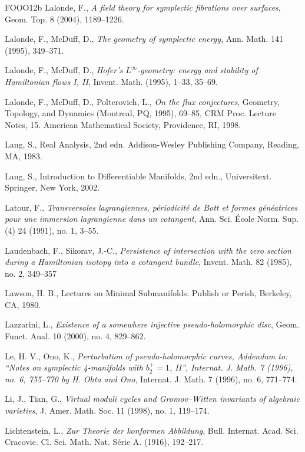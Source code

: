 \begin{thebibliography}{FOOO12b}
 Lalonde, F., \emph{A field theory for symplectic fibrations over surfaces}, Geom. Top.
  8 (2004), 1189–1226.

 Lalonde, F., McDuﬀ, D., \emph{The geometry of symplectic energy}, Ann. Math. 141
  (1995), 349–371.

 Lalonde, F., McDuff, D., \emph{Hofer’s $L^\infty$-geometry: energy and stability
  of Hamiltonian flows I, II}, Invent. Math. (1995), 1–33, 35–69.

 Lalonde, F., McDuﬀ, D., Polterovich, L., \emph{On the flux conjectures},
  Geom\-etry, Topology, and Dynamics (Montreal, PQ, 1995), 69–85, CRM Proc. Lecture Notes, 15. American
  Mathematical Society, Providence, RI, 1998.

 Lang, S., Real Analysis, 2nd edn. Addison-Wesley Publishing Company, Reading, MA,
  1983.

 Lang, S., Introduction to Diﬀerentiable Manifolds, 2nd edn., Universi\-text.
  Springer, New York, 2002.

 Latour, F., \emph{Transversales lagrangiennes, périodicité de Bott et formes
  généatrices pour une immersion lagrangienne dans un cotangent}, Ann. Sci. École Norm. Sup. (4) 24
  (1991), no. 1, 3–55.

 Laudenbach, F., Sikorav, J.-C., \emph{Persistence of intersection with the zero
  section during a Hamiltonian isotopy into a cotangent bundle}, Invent. Math. 82 (1985), no. 2, 349–357

 Lawson, H. B., Lectures on Minimal Submanifolds. Publish or Perish, Berkeley, CA,
  1980.

 Lazzarini, L., \emph{Existence of a somewhere injective pseudo-holomorphic disc},
  Geom. Funct. Anal. 10 (2000), no. 4, 829–862.

 Le, H. V., Ono, K., \emph{Perturbation of pseudo-holomorphic curves, Addendum to:
  “Notes on symplectic 4-manifolds with $b_2^+=1$, II”, Internat. J. Math. 7 (1996), no. 6, 755–770 by H.
  Ohta and Ono}, Internat. J. Math. 7 (1996), no. 6, 771–774.

 Li, J., Tian, G., \emph{Virtual moduli cycles and Gromov–Witten invariants of
  algebraic varieties}, J. Amer. Math. Soc. 11 (1998), no. 1, 119–174.

 Lichtenstein, L., \emph{Zur Theorie der konformen Abbildung}, Bull. Internat. Acad.
  Sci. Cracovie. Cl. Sci. Math. Nat. Série A. (1916), 192–217.


\end{thebibliography}
